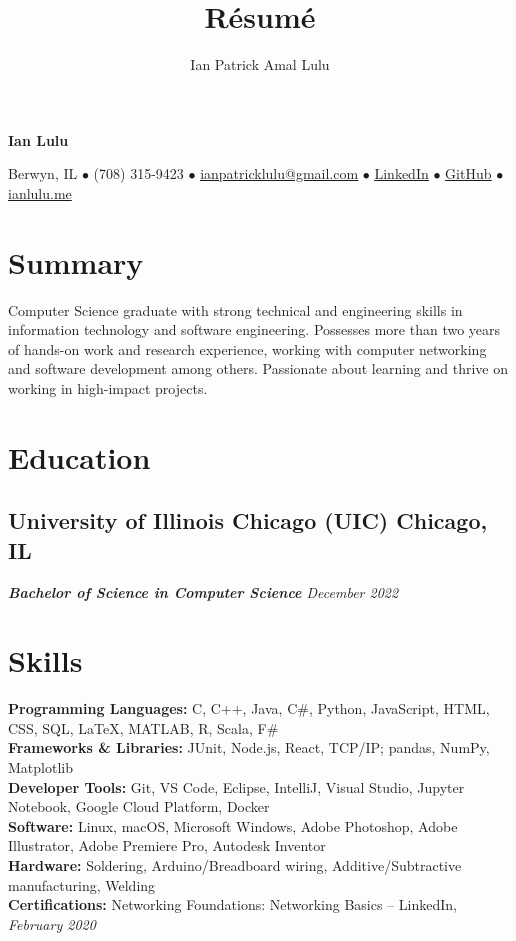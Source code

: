 \documentclass{article}
\makeatletter
\renewcommand{\maketitle}{
    \begin{center}
    {\bfseries\huge
    Ian Lulu}
    
    \vspace{0.25em}

    Berwyn, IL {$\bullet$} (708) 315-9423 {$\bullet$} \href{mailto:ianpatricklulu@gmail.com}{\underline{ianpatricklulu@gmail.com}} {$\bullet$} \href{https://www.linkedin.com/in/ianlulu/}{\underline{LinkedIn}} {$\bullet$} \href{https://github.com/IanLulu}{\underline{GitHub}} {$\bullet$} \url{ianlulu.me}
    
    \end{center}
}
\makeatother
\begin{document}
\title{R\'esum\'e}
\author{Ian Patrick Amal Lulu}


\maketitle
{} %


\section{Summary}
Computer Science graduate with strong technical and engineering skills in information technology and software engineering.
Possesses more than two years of hands-on work and research experience, working with computer networking and software development among others.
Passionate about learning and thrive on working in high-impact projects.


\section{Education}
\subsection{University of Illinois Chicago (UIC) \hfill \textnormal{Chicago, IL}}
\vspace{-0.5em}
\textit{\textbf{Bachelor of Science in Computer Science} \hfill December 2022}


\section{Skills}
\textbf{Programming Languages:} C, C++, Java, C\#, Python, JavaScript, HTML, CSS, SQL, {\LaTeX}, MATLAB, R, Scala, F\#
\\
\textbf{Frameworks \& Libraries:} JUnit, Node.js, React, TCP/IP; pandas, NumPy, Matplotlib
\\
\textbf{Developer Tools:} Git, VS Code, Eclipse, IntelliJ, Visual Studio, Jupyter Notebook, Google Cloud Platform, Docker
\\
\textbf{Software:} Linux, macOS, Microsoft Windows, Adobe Photoshop, Adobe Illustrator, Adobe Premiere Pro, Autodesk Inventor
\\
\textbf{Hardware:} Soldering, Arduino/Breadboard wiring, Additive/Subtractive manufacturing, Welding
\\
\textbf{Certifications:} Networking Foundations: Networking Basics -- LinkedIn, \textit{February 2020}
\end{document}
